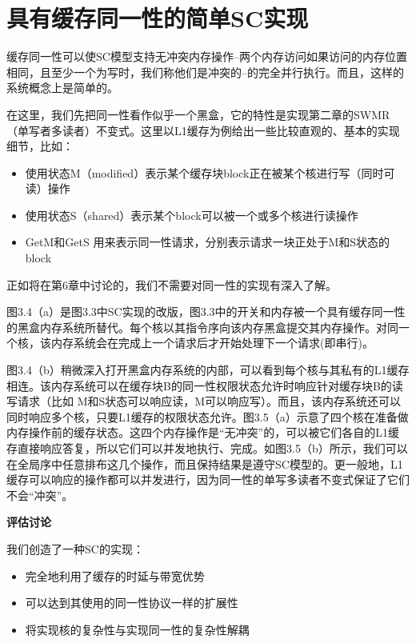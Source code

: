 \documentclass[UTF-8]{ctexrep}
\begin{document}
\section {具有缓存同一性的简单SC实现}
缓存同一性可以使SC模型支持无冲突内存操作--两个内存访问如果访问的内存位置相同，且至少一个为写时，我们称他们是冲突的--的完全并行执行。而且，这样的系统概念上是简单的。
\par 在这里，我们先把同一性看作似乎一个黑盒，它的特性是实现第二章的SWMR（单写者多读者）不变式。这里以L1缓存为例给出一些比较直观的、基本的实现细节，比如：
\begin{itemize}
\item 使用状态M（modified）表示某个缓存块block正在被某个核进行写（同时可读）操作
\item 使用状态S（shared）表示某个block可以被一个或多个核进行读操作
\item GetM和GetS 用来表示同一性请求，分别表示请求一块正处于M和S状态的block
\end{itemize}
\par 正如将在第6章中讨论的，我们不需要对同一性的实现有深入了解。
\par 图3.4（a）是图3.3中SC实现的改版，图3.3中的开关和内存被一个具有缓存同一性的黑盒内存系统所替代。每个核以其指令序向该内存黑盒提交其内存操作。对同一个核，该内存系统会在完成上一个请求后才开始处理下一个请求(即串行)。
\par 图3.4（b）稍微深入打开黑盒内存系统的内部，可以看到每个核与其私有的L1缓存相连。该内存系统可以在缓存块B的同一性权限状态允许时响应针对缓存块B的读写请求（比如 M和S状态可以响应读，M可以响应写）。而且，该内存系统还可以同时响应多个核，只要L1缓存的权限状态允许。图3.5（a）示意了四个核在准备做内存操作前的缓存状态。这四个内存操作是“无冲突”的，可以被它们各自的L1缓存直接响应答复，所以它们可以并发地执行、完成。如图3.5（b）所示，我们可以在全局序中任意排布这几个操作，而且保持结果是遵守SC模型的。更一般地，L1缓存可以响应的操作都可以并发进行，因为同一性的单写多读者不变式保证了它们不会“冲突”。
\par \textbf{评估讨论}
\par 我们创造了一种SC的实现：
\begin{itemize}
\item 完全地利用了缓存的时延与带宽优势
\item 可以达到其使用的同一性协议一样的扩展性
\item 将实现核的复杂性与实现同一性的复杂性解耦
\end{itemize}
\end{document}
